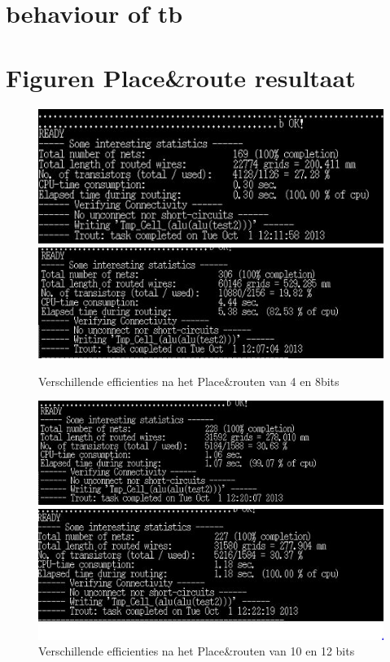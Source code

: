 \documentclass[11pt,twoside,a4paper]{article}
\begin{document}
\section{behaviour of tb}
\label{tb}

\normalsize

\section{Figuren Place\&route resultaat}
\label{c1}
\begin{figure} [h!]
\includegraphics [width=\linewidth]{figures/eff4} 
\includegraphics [width=\linewidth]{figures/eff8}
\caption{Verschillende efficienties na het Place\&routen van 4 en 8bits}
\label{k}
\end{figure}

\begin{figure} [h!]
\includegraphics [width=\linewidth]{figures/eff10} 

\includegraphics [width=\linewidth]{figures/eff12}
\caption{Verschillende efficienties na het Place\&routen van 10 en 12 bits}
\label{k}
\end{figure}
\end{document}
